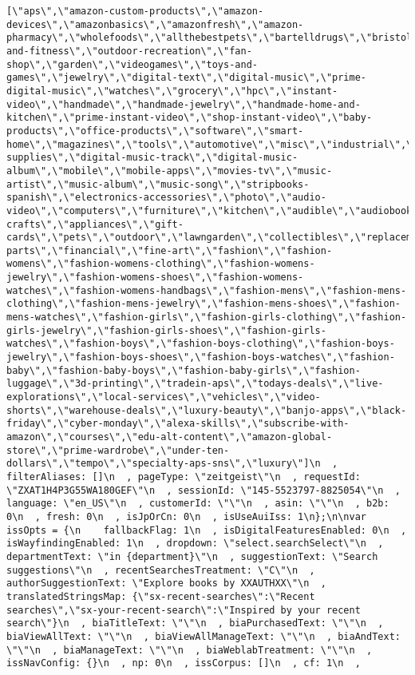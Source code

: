 \documentclass[
]{article}
\begin{document}
\begin{verbatim}
[\"aps\",\"amazon-custom-products\",\"amazon-devices\",\"amazonbasics\",\"amazonfresh\",\"amazon-pharmacy\",\"wholefoods\",\"allthebestpets\",\"bartelldrugs\",\"bristolfarms\",\"cardenas\",\"familyfare\",\"freshthyme\",\"kegnbottle\",\"missionwinespirits\",\"petfoodexpress\",\"savemart\",\"sousaswineliquors\",\"surdyksliquorcheeseshop\",\"weis\",\"stripbooks\",\"popular\",\"apparel\",\"electronics\",\"sporting\",\"sports-and-fitness\",\"outdoor-recreation\",\"fan-shop\",\"garden\",\"videogames\",\"toys-and-games\",\"jewelry\",\"digital-text\",\"digital-music\",\"prime-digital-music\",\"watches\",\"grocery\",\"hpc\",\"instant-video\",\"handmade\",\"handmade-jewelry\",\"handmade-home-and-kitchen\",\"prime-instant-video\",\"shop-instant-video\",\"baby-products\",\"office-products\",\"software\",\"smart-home\",\"magazines\",\"tools\",\"automotive\",\"misc\",\"industrial\",\"mi\",\"pet-supplies\",\"digital-music-track\",\"digital-music-album\",\"mobile\",\"mobile-apps\",\"movies-tv\",\"music-artist\",\"music-album\",\"music-song\",\"stripbooks-spanish\",\"electronics-accessories\",\"photo\",\"audio-video\",\"computers\",\"furniture\",\"kitchen\",\"audible\",\"audiobooks\",\"beauty\",\"shoes\",\"arts-crafts\",\"appliances\",\"gift-cards\",\"pets\",\"outdoor\",\"lawngarden\",\"collectibles\",\"replacement-parts\",\"financial\",\"fine-art\",\"fashion\",\"fashion-womens\",\"fashion-womens-clothing\",\"fashion-womens-jewelry\",\"fashion-womens-shoes\",\"fashion-womens-watches\",\"fashion-womens-handbags\",\"fashion-mens\",\"fashion-mens-clothing\",\"fashion-mens-jewelry\",\"fashion-mens-shoes\",\"fashion-mens-watches\",\"fashion-girls\",\"fashion-girls-clothing\",\"fashion-girls-jewelry\",\"fashion-girls-shoes\",\"fashion-girls-watches\",\"fashion-boys\",\"fashion-boys-clothing\",\"fashion-boys-jewelry\",\"fashion-boys-shoes\",\"fashion-boys-watches\",\"fashion-baby\",\"fashion-baby-boys\",\"fashion-baby-girls\",\"fashion-luggage\",\"3d-printing\",\"tradein-aps\",\"todays-deals\",\"live-explorations\",\"local-services\",\"vehicles\",\"video-shorts\",\"warehouse-deals\",\"luxury-beauty\",\"banjo-apps\",\"black-friday\",\"cyber-monday\",\"alexa-skills\",\"subscribe-with-amazon\",\"courses\",\"edu-alt-content\",\"amazon-global-store\",\"prime-wardrobe\",\"under-ten-dollars\",\"tempo\",\"specialty-aps-sns\",\"luxury\"]\n  , filterAliases: []\n  , pageType: \"zeitgeist\"\n  , requestId: \"ZXAT1H4P3G55WA180GEF\"\n  , sessionId: \"145-5523797-8825054\"\n  , language: \"en_US\"\n  , customerId: \"\"\n  , asin: \"\"\n  , b2b: 0\n  , fresh: 0\n  , isJpOrCn: 0\n  , isUseAuiIss: 1\n};\n\nvar issOpts = {\n    fallbackFlag: 1\n  , isDigitalFeaturesEnabled: 0\n  , isWayfindingEnabled: 1\n  , dropdown: \"select.searchSelect\"\n  , departmentText: \"in {department}\"\n  , suggestionText: \"Search suggestions\"\n  , recentSearchesTreatment: \"C\"\n  , authorSuggestionText: \"Explore books by XXAUTHXX\"\n  , translatedStringsMap: {\"sx-recent-searches\":\"Recent searches\",\"sx-your-recent-search\":\"Inspired by your recent search\"}\n  , biaTitleText: \"\"\n  , biaPurchasedText: \"\"\n  , biaViewAllText: \"\"\n  , biaViewAllManageText: \"\"\n  , biaAndText: \"\"\n  , biaManageText: \"\"\n  , biaWeblabTreatment: \"\"\n  , issNavConfig: {}\n  , np: 0\n  , issCorpus: []\n  , cf: 1\n  , 
\end{verbatim}
\end{document}
